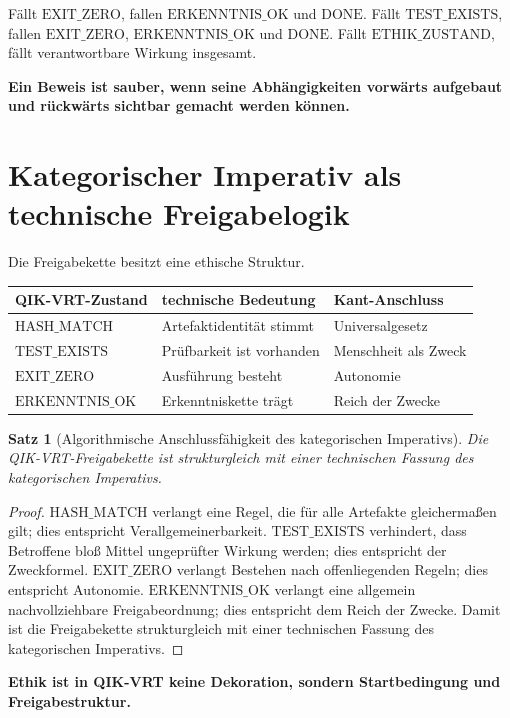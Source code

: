 \documentclass[11pt,a4paper,oneside]{scrartcl}
\theoremstyle{qikstyle}
\newtheorem{satz}{Satz}[section]
\newcommand{\DONE}{\mathrm{DONE}}
\newcommand{\HASH}{\mathrm{HASH\_MATCH}}
\newcommand{\TEST}{\mathrm{TEST\_EXISTS}}
\newcommand{\EXIT}{\mathrm{EXIT\_ZERO}}
\newcommand{\ERK}{\mathrm{ERKENNTNIS\_OK}}
\newcommand{\ETH}{\mathrm{ETHIK\_ZUSTAND}}
\newenvironment{merksatz}{\begin{center}\begin{minipage}{0.92\linewidth}\sffamily\bfseries}{\end{minipage}\end{center}}
\begin{document}
Fällt \(\EXIT\), fallen \(\ERK\) und \(\DONE\). Fällt \(\TEST\), fallen \(\EXIT\), \(\ERK\) und \(\DONE\). Fällt \(\ETH\), fällt verantwortbare Wirkung insgesamt.

\begin{merksatz}
Ein Beweis ist sauber, wenn seine Abhängigkeiten vorwärts aufgebaut und rückwärts sichtbar gemacht werden können.
\end{merksatz}
\newpage

\section{Kategorischer Imperativ als technische Freigabelogik}

Die Freigabekette besitzt eine ethische Struktur.

\begin{center}
\begin{tabular}{lll}
\toprule
QIK-VRT-Zustand & technische Bedeutung & Kant-Anschluss \\
\midrule
\(\HASH\) & Artefaktidentität stimmt & Universalgesetz \\
\(\TEST\) & Prüfbarkeit ist vorhanden & Menschheit als Zweck \\
\(\EXIT\) & Ausführung besteht & Autonomie \\
\(\ERK\) & Erkenntniskette trägt & Reich der Zwecke \\
\bottomrule
\end{tabular}
\end{center}

\begin{satz}[Algorithmische Anschlussfähigkeit des kategorischen Imperativs]
Die QIK-VRT-Freigabekette ist strukturgleich mit einer technischen Fassung des kategorischen Imperativs.
\end{satz}

\begin{proof}
\(\HASH\) verlangt eine Regel, die für alle Artefakte gleichermaßen gilt; dies entspricht Verallgemeinerbarkeit. \(\TEST\) verhindert, dass Betroffene bloß Mittel ungeprüfter Wirkung werden; dies entspricht der Zweckformel. \(\EXIT\) verlangt Bestehen nach offenliegenden Regeln; dies entspricht Autonomie. \(\ERK\) verlangt eine allgemein nachvollziehbare Freigabeordnung; dies entspricht dem Reich der Zwecke. Damit ist die Freigabekette strukturgleich mit einer technischen Fassung des kategorischen Imperativs.
\end{proof}

\begin{merksatz}
Ethik ist in QIK-VRT keine Dekoration, sondern Startbedingung und Freigabestruktur.
\end{merksatz}
\newpage
\end{document}
